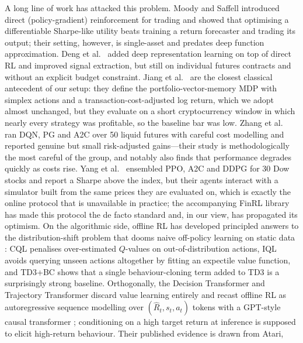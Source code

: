 \documentclass[11pt]{article}
\begin{document}
A long line of work has attacked this problem. Moody and Saffell \cite{moody2001learning}
introduced direct (policy-gradient) reinforcement for trading and showed that optimising a
differentiable Sharpe-like utility beats training a return forecaster and trading its output;
their setting, however, is single-asset and predates deep function approximation. Deng et
al.\ \cite{deng2016deep} added deep representation learning on top of direct RL and improved
signal extraction, but still on individual futures contracts and without an explicit budget
constraint. Jiang et al.\ \cite{jiang2017deep} are the closest classical antecedent of our
setup: they define the portfolio-vector-memory MDP with simplex actions and a
transaction-cost-adjusted log return, which we adopt almost unchanged, but they evaluate on a
short cryptocurrency window in which nearly every strategy was profitable, so the baseline
bar was low. Zhang et al.\ \cite{zhang2020deep} ran DQN, PG and A2C over 50 liquid futures
with careful cost modelling and reported genuine but small risk-adjusted gains---their study is
methodologically the most careful of the group, and notably also finds that performance
degrades quickly as costs rise. Yang et al.\ \cite{yang2020deep} ensembled PPO, A2C and DDPG
for 30 Dow stocks and report a Sharpe above the index, but their agents interact with a
simulator built from the same prices they are evaluated on, which is exactly the online
protocol that is unavailable in practice; the accompanying FinRL library
\cite{liu2021finrl} has made this protocol the de facto standard and, in our view,
has propagated its optimism. On the algorithmic side, offline RL has developed principled
answers to the distribution-shift problem that dooms naive off-policy learning on static data
\cite{levine2020offline}: CQL \cite{kumar2020conservative} penalises over-estimated
$Q$-values on out-of-distribution actions, IQL \cite{kostrikov2022offline} avoids querying
unseen actions altogether by fitting an expectile value function, and TD3+BC
\cite{fujimoto2021minimalist} shows that a single behaviour-cloning term added to TD3
\cite{fujimoto2018addressing} is a surprisingly strong baseline. Orthogonally, the Decision
Transformer \cite{chen2021decision} and Trajectory Transformer
\cite{janner2021trajectory} discard value learning entirely and recast offline RL as
autoregressive sequence modelling over $(\hat{R}_t, s_t, a_t)$ tokens with a GPT-style causal
transformer \cite{vaswani2017attention}; conditioning on a high target return at inference is
supposed to elicit high-return behaviour. Their published evidence is drawn from Atari,
\end{document}
